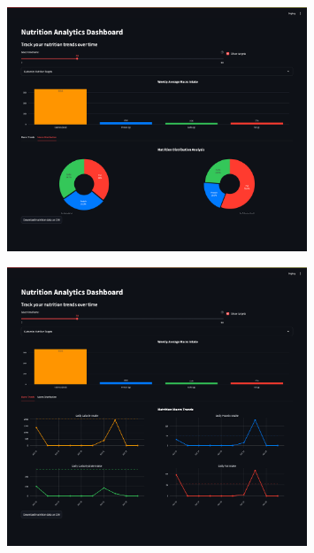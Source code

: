 \documentclass{ecai}
\begin{document}
\begin{figure}[h]
\centering
\includegraphics[width=0.8\textwidth]{../images/macro_dists.png}
\end{figure}

\begin{figure}[h]
\centering
\includegraphics[width=0.8\textwidth]{../images/macro_trends.png}
\end{figure}
\end{document}
